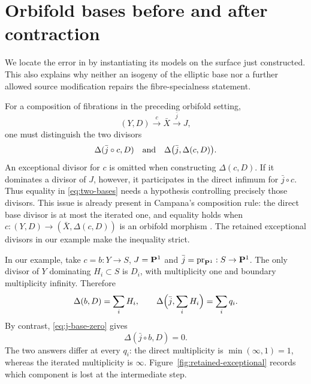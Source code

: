 \section{Orbifold bases before and after contraction}\label{sec:composition}

We locate the error in \cite[Claim 7.17]{CDHP2026} by instantiating its
models on the surface just constructed. This also explains why neither
an isogeny of the elliptic base nor a further allowed source modification
repairs the fibre-specialness statement.

For a composition of fibrations in the preceding orbifold setting,
\[
 (Y,D)\xrightarrow{c}\bar X\xrightarrow{\bar j}J,
\]
one must distinguish the two divisors
\begin{equation}\label{eq:two-bases}
 \Delta(\bar j\circ c,D)
 \quad\hbox{and}\quad
 \Delta\bigl(\bar j,\Delta(c,D)\bigr).
\end{equation}
An exceptional divisor for $c$ is omitted when constructing
$\Delta(c,D)$. If it dominates a divisor of $J$, however, it participates
in the direct infimum for $\bar j\circ c$. Thus equality in
\eqref{eq:two-bases} needs a hypothesis controlling precisely those
divisors. This issue is already present in Campana's composition rule:
the direct base divisor is at most the iterated one, and equality holds
when $c:(Y,D)\to(\bar X,\Delta(c,D))$ is an orbifold morphism
\cite[arXiv version, Proposition 3.13]{Campana2011}. The retained
exceptional divisors in our example make the inequality strict.

In our example, take $c=b:Y\to S$, $J=\mathbf P^1$ and
$\bar j=\operatorname{pr}_{\mathbf P^1}:S\to\mathbf P^1$. The only divisor of $Y$
dominating $H_i\subset S$ is $D_i$, with multiplicity one and boundary
multiplicity infinity. Therefore
\begin{equation}\label{eq:iterated-base}
 \Delta(b,D)=\sum_iH_i,
 \qquad
 \Delta\Bigl(\bar j,\sum_iH_i\Bigr)=\sum_iq_i.
\end{equation}
By contrast, \eqref{eq:j-base-zero} gives
\begin{equation}\label{eq:direct-base}
 \Delta(\bar j\circ b,D)=0.
\end{equation}
The two answers differ at every $q_i$: the direct multiplicity is
$\min(\infty,1)=1$, whereas the iterated multiplicity is $\infty$. Figure~\ref{fig:retained-exceptional} records
which component is lost at the intermediate step.



